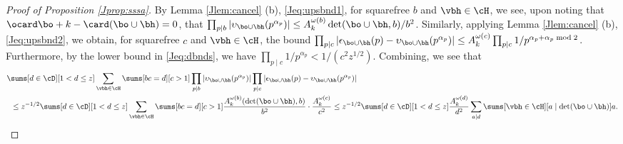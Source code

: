 \documentclass[12pt, reqno, twoside, letterpaper]{amsart}
\begin{document}
\begin{jetsam}
\begin{proof}[Proof of Proposition \ref{Jprop:sssa}]
%
By Lemma \ref{Jlem:cancel} (b), \eqref{Jeq:upsbnd1}, for squarefree 
$b$ and $\vbh \in \cH$, we see, upon noting that 
$\ocard \bo + k - \card(\bo \cup \bh) = 0$, that  
$
 \prod_{p \mid b} |\upsilon_{\bo \cup \bh}(p^{\alpha_p})|
    \le 
     A_k^{\omega(b)}\det(\bo \cup \bh,b)/b^2
$.
%
Similarly, applying Lemma \ref{Jlem:cancel} (b), 
\eqref{Jeq:upsbnd2}, we obtain, for 
squarefree $c$ and $\vbh \in \cH$, the bound 
$
 \prod_{p \mid c} |\epsilon_{\bo \cup \bh}(p) - \upsilon_{\bo \cup \bh}(p^{\alpha_p})| 
    \le 
     A_k^{\omega(c)}\prod_{p \mid c} 1/p^{\alpha_p + \alpha_p \bmod 2}
$.
%
Furthermore, by the lower bound in \eqref{Jeq:dbnds}, we have 
$\prod_{p \mid c} 1/p^{\alpha_p} < 1/(c^2z^{1/2})$.
%
Combining, we see that 
{\small
\begin{align*} 
 & 
 \sums[d \in \cD][1 < d \le z] 
  \sum_{\vbh \in \cH}
   \sums[bc = d][c > 1] 
    \prod_{p \mid b} |\upsilon_{\bo \cup \bh}(p^{\alpha_p})|
     \prod_{p \mid c} |\epsilon_{\bo \cup \bh}(p) - \upsilon_{\bo \cup \bh}(p^{\alpha_p})|
 \\
 & \hspace{5pt}
   \le 
    z^{-1/2}
     \sums[d \in \cD][1 < d \le z] 
      \sum_{\vbh \in \cH}
       \sums[bc = d][c > 1] 
        \frac{A_k^{\omega(b)}(\det(\bo \cup \bh),b)}{b^2}
         \cdot 
          \frac{A_k^{\omega(c)}}{c^2}
   \le 
    z^{-1/2}
     \sums[d \in \cD][1 < d \le z] 
      \frac{A_k^{\omega(d)}}{d^2}
       \sum_{a \mid d}
        \sums[\vbh \in \cH][a \mid \det(\bo \cup \bh)] a.
\end{align*}
}


\end{proof}
\end{jetsam}
\end{document}
